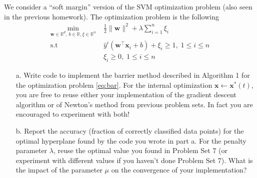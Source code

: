 \documentclass[11pt]{article}
\theoremstyle{remark}
\newcommand{\R}{\mathbb{R}}                     %
\newcommand{\bx}{\mathbf{x}}
\newcommand{\bw}{\mathbf{w}}
\begin{document}
We consider a ``soft margin'' version of the SVM optimization problem
(also seen in the previous homework).
The optimization problem is the following
\begin{equation}
    \label{eq:bar}
    \begin{aligned}
        \min_{\bw\in\R^d,\, b \in  \R, \xi\in\R^n}&\; \frac{1}{2}\|\bw\|^2
        + \lambda\sum_{i=1}^n\xi_i\\
        \text{s.t} &\; \hat{y}^i(\bw^\intercal\bx_i +b) + \xi_i \geq 1 ,\;1\leq i\leq n\\
                   &\; \xi_i\geq 0,\;1\leq i\leq n
    \end{aligned}
\end{equation}


\begin{itemize}
    \item[a.] Write code to implement the barrier method described in Algorithm
        1 for the optimization problem \eqref{eq:bar}. For the internal
          optimization $\bx\gets \bx^*(t)$, you are free to reuse either your
          implementation of the gradient descent algorithm or of Newton's
          method from previous problem sets. In fact you are encouraged to
          experiment with both!
    \item[b.] Report the accuracy (fraction of correctly classified data
        points) for the optimal hyperplane found by the code you wrote in part
        a. For the penalty parameter $\lambda$, reuse the optimal value
        you found in Problem Set 7 (or experiment with different values if you
        haven't done Problem Set 7). What is the impact of the parameter $\mu$
        on the convergence of your implementation?
\end{itemize}
\end{document}

